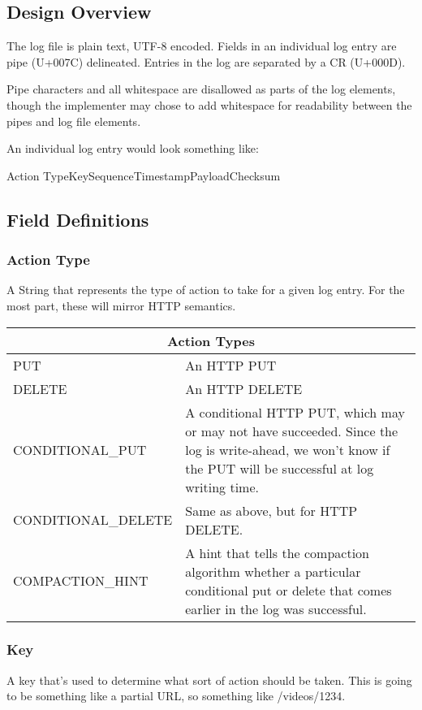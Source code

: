 \subsection{Design Overview}

The log file is plain text, UTF-8 encoded.  Fields in an individual log entry are pipe (U+007C) delineated.  Entries in the log are separated by a CR (U+000D).

Pipe characters and all whitespace  are disallowed as parts of the log elements, though the implementer may chose to add whitespace for readability between the pipes and log file elements.  

An individual log entry would look something like:
\begin{center}
Action Type\textbar Key\textbar Sequence\textbar Timestamp\textbar Payload\textbar Checksum
\end{center}


\subsection{Field Definitions}

\subsubsection{Action Type}
A String that represents the type of action to take for a given log entry.  For the most part, these will mirror HTTP semantics.

\begin{center}
\begin{tabular}{|l|p{3.5in}|}
\hline
\multicolumn{2}{|c|}{Action  Types}\\ \hline
PUT & An HTTP PUT\\ \hline
DELETE & An HTTP DELETE\\ \hline
CONDITIONAL\_PUT & A conditional HTTP PUT, which may or may not have succeeded.   Since the log is write-ahead, we won’t know if the PUT will be successful at log writing time.\\ \hline
CONDITIONAL\_DELETE & Same as above, but for HTTP DELETE.\\ \hline
COMPACTION\_HINT & A hint that tells the compaction algorithm whether a particular conditional put or delete that comes earlier in the log was successful.\\ \hline
\end{tabular}
\end{center}

\subsubsection{Key}
A key that’s used to determine what sort of action should be taken.  This is going to be something like a partial URL, so something like /videos/1234.

